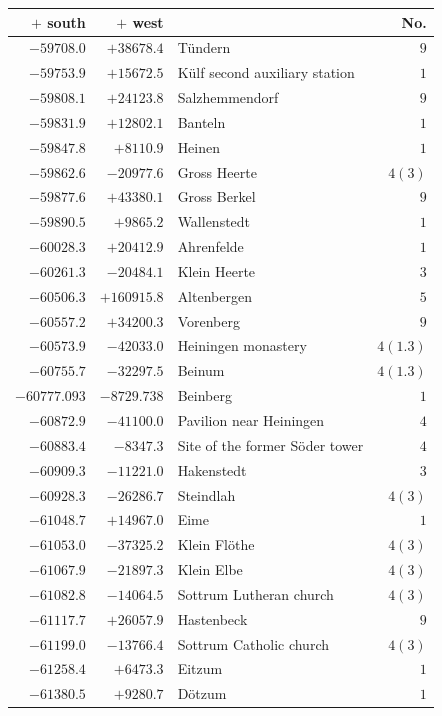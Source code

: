 \begin{center}\begingroup\fontsize{8}{9}\selectfont
\setlength{\tabcolsep}{4pt}
\begin{tabular}{r|r|p{170pt}|r}\hline
\(+\) south&\(+\) west&&No.\\\hline
\(-59708.0\)&\(+38678.4\)&Tündern&\(9\)\\
\(-59753.9\)&\(+15672.5\)&Külf second auxiliary station&\(1\)\\
\(-59808.1\)&\(+24123.8\)&Salzhemmendorf&\(9\)\\
\(-59831.9\)&\(+12802.1\)&Banteln&\(1\)\\
\(-59847.8\)&\(+8110.9\)&Heinen&\(1\)\\
\(-59862.6\)&\(-20977.6\)&Gross Heerte&\(4 (3)\)\\
\(-59877.6\)&\(+43380.1\)&Gross Berkel&\(9\)\\
\(-59890.5\)&\(+9865.2\)&Wallenstedt&\(1\)\\
\(-60028.3\)&\(+20412.9\)&Ahrenfelde&\(1\)\\
\(-60261.3\)&\(-20484.1\)&Klein Heerte&\(3\)\\
\(-60506.3\)&\(+160915.8\)&Altenbergen&\(5\)\\
\(-60557.2\)&\(+34200.3\)&Vorenberg&\(9\)\\
\(-60573.9\)&\(-42033.0\)&Heiningen monastery&\(4(1.3)\)\\
\(-60755.7\)&\(-32297.5\)&Beinum&\(4(1.3)\)\\
\(-60777.093\)&\(-8729.738\)&Beinberg&\(1\)\\
\(-60872.9\)&\(-41100.0\)&Pavilion near Heiningen&\(4\)\\
\(-60883.4\)&\(-8347.3\)&Site of the former Söder tower&\(4\)\\
\(-60909.3\)&\(-11221.0\)&Hakenstedt&\(3\)\\
\(-60928.3\)&\(-26286.7\)&Steindlah&\(4 (3)\)\\
\(-61048.7\)&\(+14967.0\)&Eime&\(1\)\\
\(-61053.0\)&\(-37325.2\)&Klein Flöthe&\(4 (3)\)\\
\(-61067.9\)&\(-21897.3\)&Klein Elbe&\(4 (3)\)\\
\(-61082.8\)&\(-14064.5\)&Sottrum Lutheran church&\(4 (3)\)\\
\(-61117.7\)&\(+26057.9\)&Hastenbeck&\(9\)\\
\(-61199.0\)&\(-13766.4\)&Sottrum Catholic church&\(4 (3)\)\\
\(-61258.4\)&\(+6473.3\)&Eitzum&\(1\)\\
\(-61380.5\)&\(+9280.7\)&Dötzum&\(1\)\\

\end{tabular}
\end{center}

